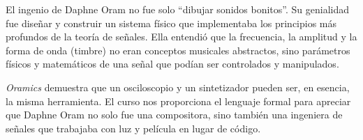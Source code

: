 \documentclass[paper=letter, fontsize=11pt, draft=false]{scrartcl}
\numberwithin{equation}{problemcounter} %
\numberwithin{figure}{problemcounter} %
\numberwithin{table}{problemcounter} %
\numberwithin{subsection}{problemcounter}
\begin{document}
El ingenio de Daphne Oram no fue solo ``dibujar sonidos bonitos''. Su genialidad fue diseñar y construir un sistema físico que implementaba los principios más profundos de la teoría de señales. Ella entendió que la frecuencia, la amplitud y la forma de onda (timbre) no eran conceptos musicales abstractos, sino parámetros físicos y matemáticos de una señal que podían ser controlados y manipulados.


\textit{Oramics} demuestra que un osciloscopio y un sintetizador pueden ser, en esencia, la misma herramienta. El curso nos proporciona el lenguaje formal para apreciar que Daphne Oram no solo fue una compositora, sino también una ingeniera de señales que trabajaba con luz y película en lugar de código.





\end{document}
